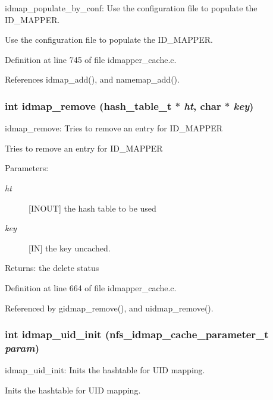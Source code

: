 idmap\_\-populate\_\-by\_\-conf: Use the configuration file to populate the ID\_\-MAPPER.

Use the configuration file to populate the ID\_\-MAPPER. 

Definition at line 745 of file idmapper\_\-cache.c.

References idmap\_\-add(), and namemap\_\-add().
\subsubsection{\setlength{\rightskip}{0pt plus 5cm}int idmap\_\-remove (hash\_\-table\_\-t $\ast$ {\em ht}, char $\ast$ {\em key})}\label{idmapper__cache_8c_a31}


idmap\_\-remove: Tries to remove an entry for ID\_\-MAPPER

Tries to remove an entry for ID\_\-MAPPER

\begin{Desc}
\item[Parameters:]
\begin{description}
\item[{\em ht}][INOUT] the hash table to be used \item[{\em key}][IN] the key uncached.\end{description}
\end{Desc}
\begin{Desc}
\item[Returns:]the delete status \end{Desc}


Definition at line 664 of file idmapper\_\-cache.c.

Referenced by gidmap\_\-remove(), and uidmap\_\-remove().
\subsubsection{\setlength{\rightskip}{0pt plus 5cm}int idmap\_\-uid\_\-init (nfs\_\-idmap\_\-cache\_\-parameter\_\-t {\em param})}\label{idmapper__cache_8c_a14}


idmap\_\-uid\_\-init: Inits the hashtable for UID mapping.

Inits the hashtable for UID mapping.

